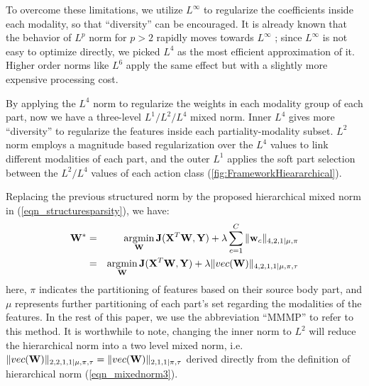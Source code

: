 \documentclass[9pt,technote,compsoc]{IEEEtran}
\begin{document}
To overcome these limitations, we utilize $L^\infty$ to regularize the coefficients inside each modality, so that ``diversity'' \cite{Kowalski2009303} can be encouraged. It is already known that the behavior of $L^p$ norm for $p>2$ rapidly moves towards $L^\infty$ \cite{5948411}; since $L^\infty$ is not easy to optimize directly, we picked $L^4$ as the most efficient approximation of it. Higher order norms like $L^6$ apply the same effect but with a slightly more expensive processing cost. 


By applying the $L^4$ norm to regularize the weights in each modality group of each part, now we have a three-level $L^1/L^2/L^4$ mixed norm. Inner $L^4$ gives more ``diversity''  to regularize the features inside each partiality-modality subset. $L^2$ norm employs a magnitude based regularization over the $L^4$ values to link different modalities of each part, and the outer $L^1$ applies the soft part selection between the $L^2/L^4$ values of each action class (\figurename{\ref{fig:FrameworkHieararchical}}).


Replacing the previous structured norm by the proposed hierarchical mixed norm in (\ref{eqn_structuresparsity}), we have:
\begin{eqnarray}
\label{eqn_structuresparsity421S}{\bf W}^*&=&\mathop{\arg\!\min}_{\bf W}{\bf J}({\bf X}^T{\bf W},{\bf Y})+\lambda\sum_{c=1}^{C}\|{\bf w}_c\|_{4,2,1|\mu,\pi}\nonumber\\
\label{eqn_structuresparsity421}&=&\mathop{\arg\!\min}_{\bf W}{\bf J}({\bf X}^T{\bf W},{\bf Y})+\lambda\|vec({\bf W})\|_{4,2,1,1|\mu,\pi,\tau}
\end{eqnarray}
here, $\pi$ indicates the partitioning of features based on their source body part, and $\mu$ represents further partitioning of each part's set regarding the modalities of the features. In the rest of this paper, we use the abbreviation ``MMMP'' to refer to this method. It is worthwhile to note, changing the inner norm to $L^2$ will reduce the hierarchical norm into a two level mixed norm, i.e.  $\|vec({\bf W})\|_{2,2,1,1|\mu,\pi,\tau}=\|vec({\bf W})\|_{2,1,1|\pi,\tau}$ derived directly from the definition of hierarchical norm (\ref{eqn_mixednorm3}).
\end{document}
